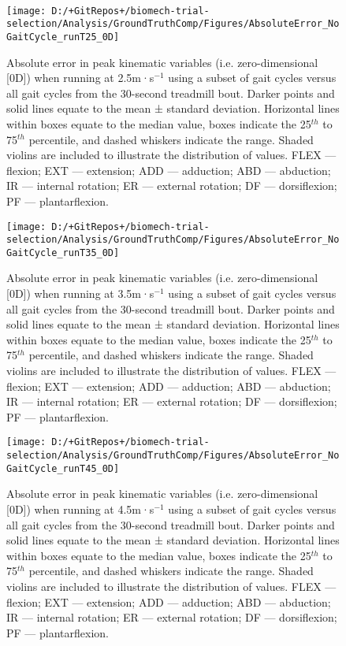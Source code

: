 \documentclass[]{elsarticle} %
\begin{document}
~

\begin{figure}

{\centering \texttt{[image: D:/+GitRepos+/biomech-trial-selection/Analysis/GroundTruthComp/Figures/AbsoluteError\_NoGaitCycle\_runT25\_0D]} 

}

\caption{Absolute error in peak kinematic variables (i.e. zero-dimensional [0D]) when running at 2.5m·s$^{-1}$ using a subset of gait cycles versus all gait cycles from the 30-second treadmill bout. Darker points and solid lines equate to the mean ± standard deviation. Horizontal lines within boxes equate to the median value, boxes indicate the 25$^{th}$ to 75$^{th}$ percentile, and dashed whiskers indicate the range. Shaded violins are included to illustrate the distribution of values. FLEX — flexion; EXT — extension; ADD — adduction; ABD — abduction; IR — internal rotation; ER — external rotation; DF — dorsiflexion; PF — plantarflexion.}\label{fig:groundTruthError-runT25-0D}
\end{figure}

\begin{figure}

{\centering \texttt{[image: D:/+GitRepos+/biomech-trial-selection/Analysis/GroundTruthComp/Figures/AbsoluteError\_NoGaitCycle\_runT35\_0D]} 

}

\caption{Absolute error in peak kinematic variables (i.e. zero-dimensional [0D]) when running at 3.5m·s$^{-1}$ using a subset of gait cycles versus all gait cycles from the 30-second treadmill bout. Darker points and solid lines equate to the mean ± standard deviation. Horizontal lines within boxes equate to the median value, boxes indicate the 25$^{th}$ to 75$^{th}$ percentile, and dashed whiskers indicate the range. Shaded violins are included to illustrate the distribution of values. FLEX — flexion; EXT — extension; ADD — adduction; ABD — abduction; IR — internal rotation; ER — external rotation; DF — dorsiflexion; PF — plantarflexion.}\label{fig:groundTruthError-runT35-0D}
\end{figure}

\begin{figure}

{\centering \texttt{[image: D:/+GitRepos+/biomech-trial-selection/Analysis/GroundTruthComp/Figures/AbsoluteError\_NoGaitCycle\_runT45\_0D]} 

}

\caption{Absolute error in peak kinematic variables (i.e. zero-dimensional [0D]) when running at 4.5m·s$^{-1}$ using a subset of gait cycles versus all gait cycles from the 30-second treadmill bout. Darker points and solid lines equate to the mean ± standard deviation. Horizontal lines within boxes equate to the median value, boxes indicate the 25$^{th}$ to 75$^{th}$ percentile, and dashed whiskers indicate the range. Shaded violins are included to illustrate the distribution of values. FLEX — flexion; EXT — extension; ADD — adduction; ABD — abduction; IR — internal rotation; ER — external rotation; DF — dorsiflexion; PF — plantarflexion.}\label{fig:groundTruthError-runT45-0D}
\end{figure}
\end{document}
